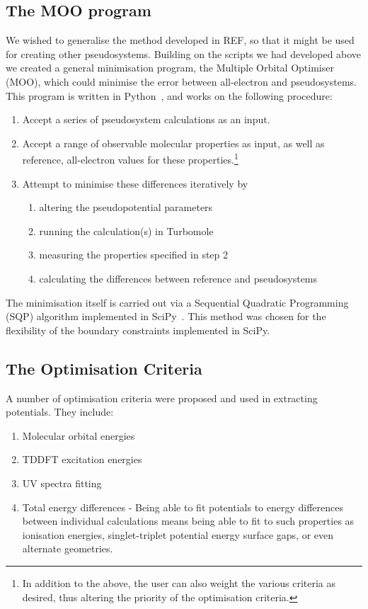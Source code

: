 \documentclass[aip,reprint,nofootinbib]{revtex4-1}
\begin{document}
\subsection{The MOO program}

We wished to generalise the method developed in REF, so that it might be used for creating other pseudosystems. Building on the scripts we had developed above we created a general minimisation program, the Multiple Orbital Optimiser (MOO), which could minimise the error between all-electron and pseudosystems. This program is written in Python~\cite{python}, and works on the following procedure:

\begin{enumerate}
\item Accept a series of pseudosystem calculations as an input. 
\item Accept a range of observable molecular properties as input, as well as reference, all-electron values for these properties.\footnote{In addition to the above, the user can also weight the various criteria as desired, thus altering the priority of the optimisation criteria.}
\item Attempt to minimise these differences iteratively by 
\begin{enumerate}
\item altering the pseudopotential parameters 
\item running the calculation(s) in Turbomole~\cite{TURBOMOLE}
\item measuring the properties specified in step 2 
\item calculating the differences between reference and pseudosystems
\end{enumerate}
\end{enumerate}

The minimisation itself is carried out via a Sequential Quadratic Programming (SQP) algorithm implemented in SciPy~\cite{scipy}. This method was chosen for the flexibility of the boundary constraints implemented in SciPy.

\subsection{The Optimisation Criteria}

A number of optimisation criteria were proposed and used in extracting potentials. They include: 

\begin{enumerate}
\item Molecular orbital energies
\item TDDFT excitation energies
\item UV spectra fitting
\item Total energy differences - Being able to fit potentials to energy differences between individual calculations means being able to fit to such properties as ionisation energies, singlet-triplet potential energy surface gaps, or even alternate geometries.
\end{enumerate}
\end{document}
